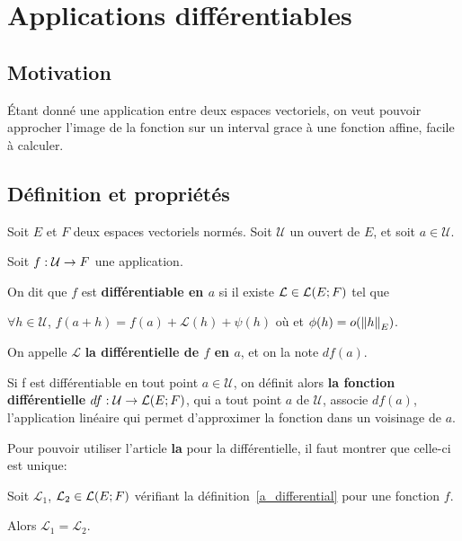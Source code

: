 \chapter{Applications différentiables}
\label{chap:differential}
\section{Motivation}
	Étant donné une application entre deux espaces vectoriels, on veut pouvoir
	approcher l'image de la fonction sur un interval grace à une fonction
	affine, facile à calculer.


\section{Définition et propriétés}


\begin{definition} 
\label{a_differential}
	Soit $E$ et $F$ deux espaces vectoriels normés.
	Soit $\mathcal{U}$ un ouvert de $E$, et soit $a \in \mathcal{U}$.

	Soit $f : \mathcal{U} \rightarrow F$ une application.

	On dit que $f$ est \textbf{différentiable en $a$} si il existe $\mathcal{L}
	\in \mathcal{L}(E; F)$ tel que

	$\forall h \in \mathcal{U}$,
	$f(a + h) = f(a) + \mathcal{L}(h) + \psi(h)$ où
	et $\phi(h) = o(\norm{h}_{E})$.

\end{definition}

On appelle $\mathcal{L}$ \textbf{la différentielle de $f$ en $a$}, et on la note
$df(a)$.

Si f est différentiable en tout point $a \in \mathcal{U}$, on définit alors
\textbf{la fonction différentielle}
$df : \mathcal{U} \rightarrow \mathcal{L}(E; F)$, qui a tout point $a$
de $\mathcal{U}$, associe $df(a)$, l'application linéaire qui permet
d'approximer la fonction dans un voisinage de $a$.

Pour pouvoir utiliser l'article \textbf{la} pour la différentielle, il faut
montrer que celle-ci est unique:

\begin{proposition}
	Soit $\mathcal{L}_{1}$, $\mathcal{L}_{2} \in \mathcal{L}(E; F)$
	vérifiant la définition~\ref{a_differential} pour une fonction $f$.

	Alors $\mathcal{L}_{1} = \mathcal{L}_{2}$.
\end{proposition}

